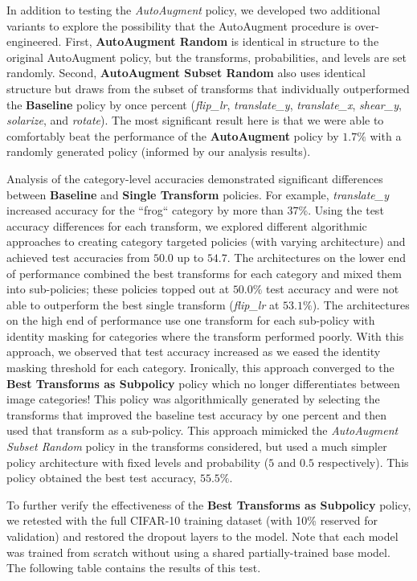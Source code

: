 \documentclass[10pt,twocolumn,letterpaper]{article}
\begin{document}
In addition to testing the \textit{AutoAugment} policy, we developed two additional variants to explore the possibility that the AutoAugment procedure is over-engineered. First, \textbf{AutoAugment Random} is identical in structure to the original AutoAugment policy, but the transforms, probabilities, and levels are set randomly. Second, \textbf{AutoAugment Subset Random} also uses identical structure but draws from the subset of transforms that individually outperformed the \textbf{Baseline} policy by once percent (\textit{flip\_lr}, \textit{translate\_y}, \textit{translate\_x}, \textit{shear\_y}, \textit{solarize}, and \textit{rotate}). The most significant result here is that we were able to comfortably beat the performance of the \textbf{AutoAugment} policy by $1.7\%$ with a randomly generated policy (informed by our analysis results).

Analysis of the category-level accuracies demonstrated significant differences between \textbf{Baseline} and \textbf{Single Transform} policies. For example, \textit{translate\_y} increased accuracy for the ``frog`` category by more than $37\%$. Using the test accuracy differences for each transform, we explored different algorithmic approaches to creating category targeted policies (with varying architecture) and achieved test accuracies from $50.0$ up to $54.7$. The architectures on the lower end of performance combined the best transforms for each category and mixed them into sub-policies; these policies topped out at $50.0\%$ test accuracy and were not able to outperform the best single transform (\textit{flip\_lr} at $53.1\%$). The architectures on the high end of performance use one transform for each sub-policy with identity masking for categories where the transform performed poorly. With this approach, we observed that test accuracy increased as we eased the identity masking threshold for each category. Ironically, this approach converged to the \textbf{Best Transforms as Subpolicy} policy which no longer differentiates between image categories! This policy was algorithmically generated by selecting the transforms that improved the baseline test accuracy by one percent and then used that transform as a sub-policy. This approach mimicked the \textit{AutoAugment Subset Random} policy in the transforms considered, but used a much simpler policy architecture with fixed levels and probability ($5$ and $0.5$ respectively). This policy obtained the best test accuracy, $55.5\%$.

To further verify the effectiveness of the \textbf{Best Transforms as Subpolicy} policy, we retested with the full CIFAR-10 training dataset (with 10\% reserved for validation) and restored the dropout layers to the model. Note that each model was trained from scratch without using a shared partially-trained base model. The following table contains the results of this test.
\end{document}
